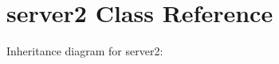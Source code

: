 \hypertarget{classserver2}{}\section{server2 Class Reference}
\label{classserver2}


Inheritance diagram for server2\+:

